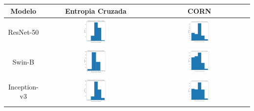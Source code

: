 \begin{table}[!htbp]
    \centering
    \begin{tabular}{|c|c|c|}
        \hline
        \textbf{Modelo} & \textbf{Entropia Cruzada} & \textbf{CORN} \\ \hline
        ResNet-50 & \includegraphics[width=0.25\textwidth]{figs/conformal_prediction/resnet50_cp_cross_entropy.png} & \includegraphics[width=0.25\textwidth]{figs/conformal_prediction/resnet50_cp_corn.png} \\ \hline
        Swin-B & \includegraphics[width=0.25\textwidth]{figs/conformal_prediction/swin_b_cp_cross_entropy.png} & \includegraphics[width=0.25\textwidth]{figs/conformal_prediction/swin_b_cp_corn.png} \\ \hline
        Inception-v3 & \includegraphics[width=0.25\textwidth]{figs/conformal_prediction/inception_v3_cp_cross_entropy.png} & \includegraphics[width=0.25\textwidth]{figs/conformal_prediction/inception_v3_cp_corn.png} \\ \hline

\end{tabular}
\end{table}
